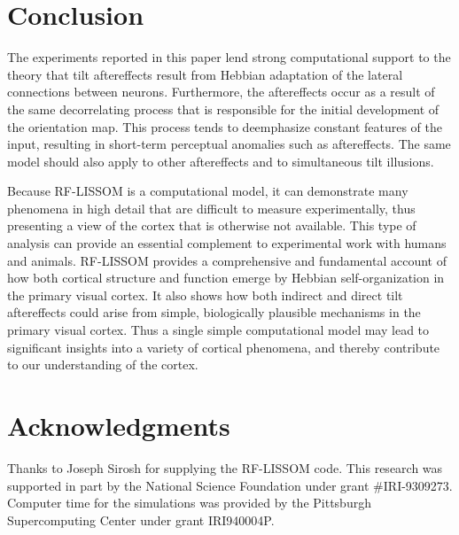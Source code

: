 \documentclass[10pt]{article}   %
\begin{document}
\section{Conclusion}

The experiments reported in this paper lend strong computational
support to the theory that tilt aftereffects result from Hebbian
adaptation of the lateral connections between neurons.
Furthermore, the aftereffects occur as a result of the same
decorrelating process that is responsible for the initial development
of the orientation map.  This process tends to deemphasize constant
features of the input, resulting in short-term perceptual anomalies
such as aftereffects.  The same model should also apply to other 
aftereffects and to simultaneous tilt illusions.

Because RF-LISSOM is a computational model, it can demonstrate many
phenomena in high detail that are difficult to measure experimentally,
thus presenting a view of the cortex that is otherwise not available.
This type of analysis can provide an essential complement to
experimental work with humans and animals.
RF-LISSOM provides a comprehensive and fundamental account of how both
cortical structure and function emerge by Hebbian self-organization in
the primary visual cortex.  It also shows how both indirect and direct
tilt aftereffects could arise from simple, biologically plausible
mechanisms in the primary visual cortex.  Thus a single simple
computational model may lead to significant insights into a variety of
cortical phenomena, and thereby contribute to our understanding of the
cortex.

\appendix 
\section{Acknowledgments}

Thanks to Joseph Sirosh for supplying the RF-LISSOM code. This
research was supported in part by the National Science Foundation 
under grant \#IRI-9309273.  Computer time for the simulations was
provided by the Pittsburgh Supercomputing Center under grant
IRI940004P.



\end{document}
